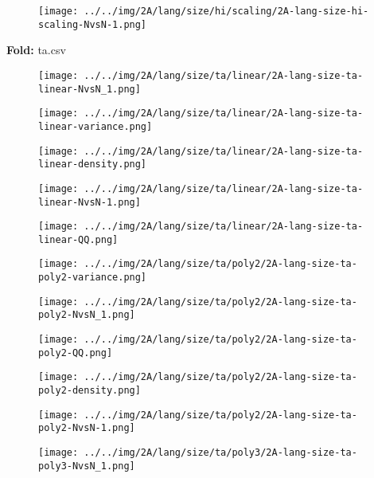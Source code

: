 \begin{figure}[H]
\centering	\texttt{[image: ../../img/2A/lang/size/hi/scaling/2A-lang-size-hi-scaling-NvsN-1.png]}
\end{figure}
\textbf{Fold:} ta.csv
\begin{figure}[H]
\centering	\texttt{[image: ../../img/2A/lang/size/ta/linear/2A-lang-size-ta-linear-NvsN\_1.png]}
\end{figure}
\begin{figure}[H]
\centering	\texttt{[image: ../../img/2A/lang/size/ta/linear/2A-lang-size-ta-linear-variance.png]}
\end{figure}
\begin{figure}[H]
\centering	\texttt{[image: ../../img/2A/lang/size/ta/linear/2A-lang-size-ta-linear-density.png]}
\end{figure}
\begin{figure}[H]
\centering	\texttt{[image: ../../img/2A/lang/size/ta/linear/2A-lang-size-ta-linear-NvsN-1.png]}
\end{figure}
\begin{figure}[H]
\centering	\texttt{[image: ../../img/2A/lang/size/ta/linear/2A-lang-size-ta-linear-QQ.png]}
\end{figure}
\begin{figure}[H]
\centering	\texttt{[image: ../../img/2A/lang/size/ta/poly2/2A-lang-size-ta-poly2-variance.png]}
\end{figure}
\begin{figure}[H]
\centering	\texttt{[image: ../../img/2A/lang/size/ta/poly2/2A-lang-size-ta-poly2-NvsN\_1.png]}
\end{figure}
\begin{figure}[H]
\centering	\texttt{[image: ../../img/2A/lang/size/ta/poly2/2A-lang-size-ta-poly2-QQ.png]}
\end{figure}
\begin{figure}[H]
\centering	\texttt{[image: ../../img/2A/lang/size/ta/poly2/2A-lang-size-ta-poly2-density.png]}
\end{figure}
\begin{figure}[H]
\centering	\texttt{[image: ../../img/2A/lang/size/ta/poly2/2A-lang-size-ta-poly2-NvsN-1.png]}
\end{figure}
\begin{figure}[H]
\centering	\texttt{[image: ../../img/2A/lang/size/ta/poly3/2A-lang-size-ta-poly3-NvsN\_1.png]}
\end{figure}

